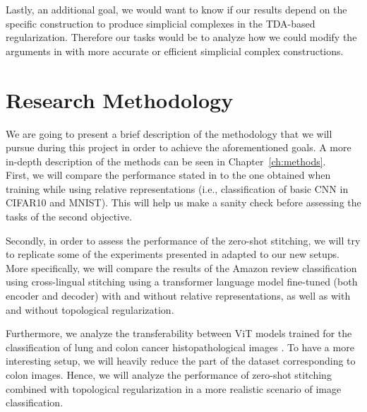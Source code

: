 \documentclass[../main.tex]{subfiles}
\begin{document}
Lastly, an additional goal, we would want to know if our results depend on the specific construction to produce simplicial complexes in the TDA-based regularization. Therefore our tasks would be to analyze how we could  modify the arguments in \cite{hofer_densified_2021} with more accurate or efficient simplicial complex constructions. 


\section{Research Methodology}

We are going to present a brief description of the methodology that we will pursue during this project in order to achieve the aforementioned goals. A more in-depth description of the methods can be seen in Chapter~\ref{ch:methods}.\\

First, we will compare the performance stated in \cite{hofer_densified_2021} to the one obtained when training while using relative representations (i.e., classification of basic CNN in CIFAR10 and MNIST). This will help us make a sanity check before assessing the tasks of the second objective.

Secondly, in order to assess the performance of the zero-shot stitching, we will try to replicate some of the experiments presented in \cite{moschella_relative_2022} adapted to our new setups. More specifically, we will compare the results of the Amazon review classification using cross-lingual stitching using a transformer language model fine-tuned (both encoder and decoder) with and without relative representations, as well as with and without topological regularization. 

Furthermore, we analyze the transferability between ViT models \cite{dosovitskiy_vit_2021} trained for the classification of lung and colon cancer histopathological images \cite{borkowski_lung_2019}. To have a more interesting setup, we will heavily reduce the part of the dataset corresponding to colon images. Hence, we will analyze the performance of zero-shot stitching combined with topological regularization in a more realistic scenario of image classification.\\
\end{document}
